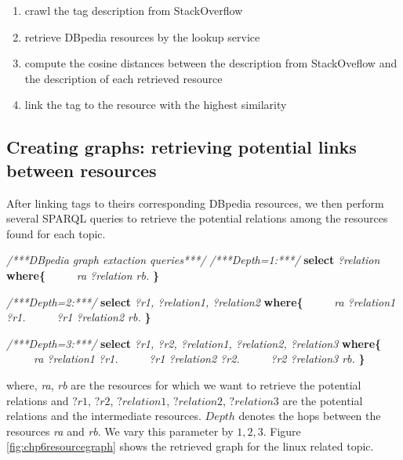 \begin{enumerate}
    \item{crawl the tag description from StackOverflow}
    \item{retrieve DBpedia resources by the lookup service}
    \item{compute the cosine distances between the description from StackOveflow and the description of each retrieved resource}
    \item{link the tag to the resource with the highest similarity}
\end{enumerate}




\subsection{Creating graphs: retrieving potential links between resources}
After linking tags to theirs corresponding DBpedia resources, we then perform several SPARQL queries to retrieve the potential relations among the resources found for each topic. 


\begin{algorithm}%
\begin{algorithmic}[1]
\label{algo:dbpediaquery}
\State \textit{/***DBpedia graph extaction queries***/}
\State \textit{/***Depth=1:***/}
\State \textbf{select} \textit{?relation}
\State \textbf{where\{}
\State \ \ \ \ \ \textit{ra ?relation rb.}
\State \textbf{\}}

\State \textit{/***Depth=2:***/}
\State \textbf{select}  \textit{?r1, ?relation1, ?relation2} 
\State \textbf{where\{} 
\State \ \ \ \ \ \textit{ra ?relation1 ?r1.}
\State \ \ \ \ \ \textit{?r1 ?relation2 rb.} 
\State \textbf{\}} 

\State \textit{/***Depth=3:***/}
\State \textbf{select}  \textit{?r1, ?r2, ?relation1, ?relation2, ?relation3} 
\State \textbf{where\{} 
\State \ \ \ \ \ \textit{ra ?relation1 ?r1.}
\State \ \ \ \ \ \textit{?r1 ?relation2 ?r2.}
\State \ \ \ \ \ \textit{?r2 ?relation3 rb.} 
\State \textbf{\}} 
\end{algorithmic}
\end{algorithm}

where, \textit{ra}, \textit{rb} are the resources for which we want to retrieve the potential relations and $?r1$, $?r2$, $?relation1$, $?relation2$, $?relation3$ are the potential relations and the intermediate resources. $Depth$ denotes the hops between the resources \textit{ra} and \textit{rb}. We vary this parameter by $1,2,3$. Figure \ref{fig:chp6resourcegraph} shows the retrieved graph for the linux related topic.

